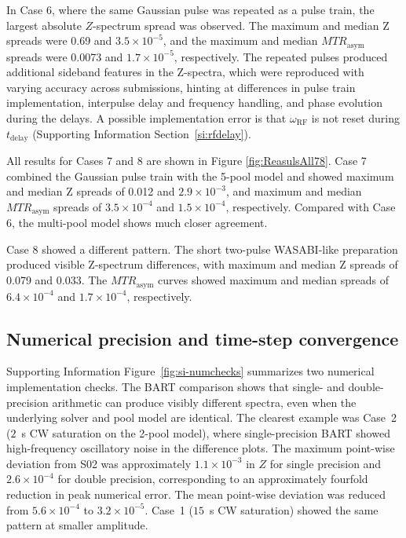 \documentclass[11pt,a4paper]{article}
\begin{document}
In Case 6, where the same Gaussian pulse was repeated as a pulse train, the largest absolute $Z$-spectrum spread was observed. The maximum and median Z spreads were 0.69 and $3.5 \times 10^{-5}$, and the maximum and median $MTR_{\mathrm{asym}}$ spreads were 0.0073 and $1.7 \times 10^{-5}$, respectively. The repeated pulses produced additional sideband features in the Z-spectra, which were reproduced with varying accuracy across submissions, hinting at differences in pulse train implementation, interpulse delay and frequency handling, and phase evolution during the delays.
A possible implementation error is that $\omega_{\mathrm{RF}}$ is not reset during $t_{\mathrm{delay}}$ (Supporting Information Section~\ref{si:rfdelay}).

All results for Cases 7 and 8 are shown in Figure \ref{fig:ReasulsAll78}. Case 7 combined the Gaussian pulse train with the 5-pool model and showed maximum and median Z spreads of 0.012 and $2.9 \times 10^{-3}$, and maximum and median $MTR_{\mathrm{asym}}$ spreads of $3.5 \times 10^{-4}$ and $1.5 \times 10^{-4}$, respectively. Compared with Case 6, the multi-pool model shows much closer agreement.

Case 8 showed a different pattern. The short two-pulse WASABI-like preparation produced visible Z-spectrum differences, with maximum and median Z spreads of 0.079 and 0.033. The $MTR_{\mathrm{asym}}$ curves showed maximum and median spreads of $6.4 \times 10^{-4}$ and $1.7 \times 10^{-4}$, respectively. 

\subsection{Numerical precision and time-step convergence}\label{subsec:res:numchecks}
Supporting Information Figure~\ref{fig:si-numchecks} summarizes two numerical implementation checks. The BART comparison shows that single- and double-precision arithmetic can produce visibly different spectra, even when the underlying solver and pool model are identical. The clearest example was Case~2 ($2$~s CW saturation on the 2-pool model), where single-precision BART showed high-frequency oscillatory noise in the difference plots. The maximum point-wise deviation from S02 was approximately $1.1 \times 10^{-3}$ in $Z$ for single precision and $2.6 \times 10^{-4}$ for double precision, corresponding to an approximately fourfold reduction in peak numerical error. The mean point-wise deviation was reduced from $5.6 \times 10^{-4}$ to $3.2 \times 10^{-5}$. Case~1 ($15$~s CW saturation) showed the same pattern at smaller amplitude.
\end{document}

